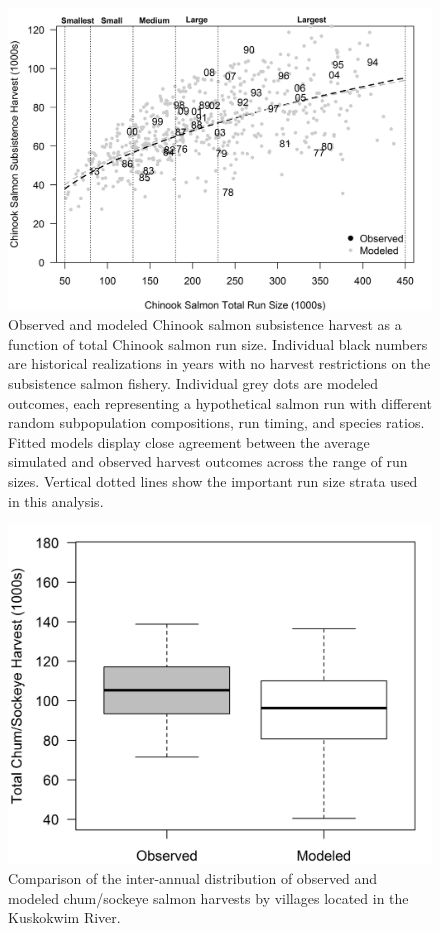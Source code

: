 \documentclass[12pt,]{book}
\theoremstyle{definition}
\theoremstyle{definition}
\theoremstyle{definition}
\theoremstyle{remark}
\begin{document}
\begin{figure}
  \centering
  \includegraphics{img/Ch3/Figure B1.jpg}
  \caption{Observed and modeled Chinook salmon subsistence harvest as a function of total Chinook salmon run size. Individual black numbers are historical realizations in years with no harvest restrictions on the subsistence salmon fishery. Individual grey dots are modeled outcomes, each representing a hypothetical salmon run with different random subpopulation compositions, run timing, and species ratios. Fitted models display close agreement between the average simulated and observed harvest outcomes across the range of run sizes. Vertical dotted lines show the important run size strata used in this analysis.}
  \label{fig:HvN}
\end{figure}

\begin{figure}
  \centering
  \includegraphics{img/Ch3/Figure B2.jpg}
  \caption{Comparison of the inter-annual distribution of observed and modeled chum/sockeye salmon harvests by villages located in the Kuskokwim River.}
  \label{fig:chsk-harvest}
\end{figure}
\end{document}
